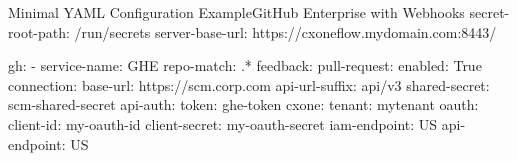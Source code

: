 \begin{code}{Minimal YAML Configuration Example}{GitHub Enterprise with Webhooks}{}
secret-root-path: /run/secrets
server-base-url: https://cxoneflow.mydomain.com:8443/

gh:
    - service-name: GHE
      repo-match: .*
      feedback:
        pull-request:
          enabled: True
      connection:
        base-url: https://scm.corp.com
        api-url-suffix: api/v3
        shared-secret: scm-shared-secret
        api-auth:
          token: ghe-token
      cxone:
        tenant: mytenant
        oauth:
          client-id: my-oauth-id
          client-secret: my-oauth-secret
        iam-endpoint: US
        api-endpoint: US
\end{code}
  